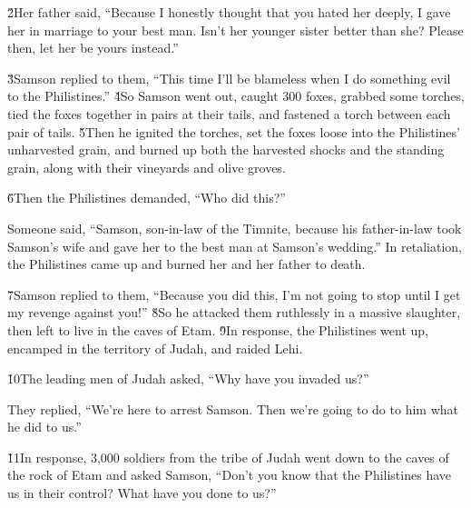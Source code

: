 \v{2}Her father said, ``Because I honestly thought that you hated her deeply, I gave her in marriage to your best man. Isn't her younger sister better than she? Please then, let her be yours instead.''

\v{3}Samson replied to them, ``This time I'll be blameless when I do something evil to the Philistines.'' \v{4}So Samson went out, caught 300 foxes, grabbed some torches, tied the foxes together in pairs at their tails, and fastened a torch between each pair of tails. \v{5}Then he ignited the torches, set the foxes loose into the Philistines' unharvested grain, and burned up both the harvested shocks and the standing grain, along with their vineyards and olive groves.

\v{6}Then the Philistines demanded, ``Who did this?''

Someone said, ``Samson, son-in-law of the Timnite, because his father-in-law took Samson's wife and gave her to the best man at Samson's wedding.'' In retaliation, the Philistines came up and burned her and her father to death.

\v{7}Samson replied to them, ``Because you did this, I'm not going to stop until I get my revenge against you!'' \v{8}So he attacked them ruthlessly in a massive slaughter, then left to live in the caves of Etam. \v{9}In response, the Philistines went up, encamped in the territory of Judah, and raided Lehi.

\v{10}The leading men of Judah asked, ``Why have you invaded us?''

They replied, ``We're here to arrest Samson. Then we're going to do to him what he did to us.''

\v{11}In response, 3,000 soldiers from the tribe of Judah went down to the caves of the rock of Etam and asked Samson, ``Don't you know that the Philistines have us in their control? What have you done to us?''

